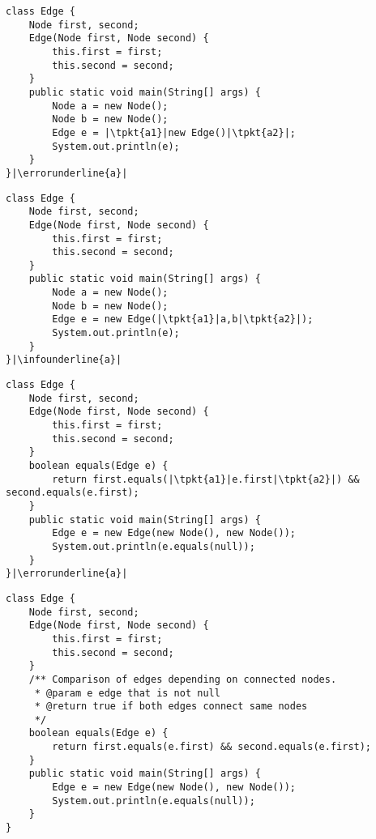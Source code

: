 \newsavebox{\edgetypeerror}
\begin{lrbox}{\edgetypeerror}
	\begin{lstlisting}
class Edge {
	Node first, second;
	Edge(Node first, Node second) {
		this.first = first;
		this.second = second;
	}
	public static void main(String[] args) {
		Node a = new Node();
		Node b = new Node();
		Edge e = |\tpkt{a1}|new Edge()|\tpkt{a2}|;
		System.out.println(e);
	}
}|\errorunderline{a}|
\end{lstlisting}
\end{lrbox}

\newsavebox{\edgetypeerrorfix}
\begin{lrbox}{\edgetypeerrorfix}
\begin{lstlisting}
class Edge {
	Node first, second;
	Edge(Node first, Node second) {
		this.first = first;
		this.second = second;
	}
	public static void main(String[] args) {
		Node a = new Node();
		Node b = new Node();
		Edge e = new Edge(|\tpkt{a1}|a,b|\tpkt{a2}|);
		System.out.println(e);
	}
}|\infounderline{a}|
\end{lstlisting}
\end{lrbox}

\newsavebox{\edgeruntimeerror}
\begin{lrbox}{\edgeruntimeerror}
	\begin{lstlisting}
class Edge {
	Node first, second;
	Edge(Node first, Node second) {
		this.first = first;
		this.second = second;
	}
	boolean equals(Edge e) {
		return first.equals(|\tpkt{a1}|e.first|\tpkt{a2}|) && second.equals(e.first);
	}
	public static void main(String[] args) {
		Edge e = new Edge(new Node(), new Node());
		System.out.println(e.equals(null));
	}
}|\errorunderline{a}|
	\end{lstlisting}
\end{lrbox}

\newsavebox{\javadoc}
\begin{lrbox}{\javadoc}
	\begin{lstlisting}
class Edge {
	Node first, second;
	Edge(Node first, Node second) {
		this.first = first;
		this.second = second;
	}
	/** Comparison of edges depending on connected nodes.
	 * @param e edge that is not null
	 * @return true if both edges connect same nodes
	 */
	boolean equals(Edge e) {
		return first.equals(e.first) && second.equals(e.first);
	}
	public static void main(String[] args) {
		Edge e = new Edge(new Node(), new Node());
		System.out.println(e.equals(null));
	}
}
	\end{lstlisting}
\end{lrbox}

